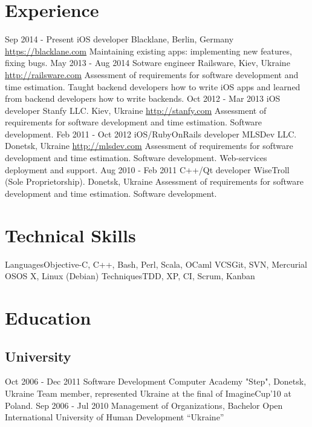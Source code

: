 \documentclass[11pt,a4paper]{moderncv}
\begin{document}
\section{Experience}
\cventry
  {Sep 2014 - Present}
  {iOS developer}
  {Blacklane, Berlin, Germany}
  {\newline{}\url{https://blacklane.com}}{}
  {Maintaining existing apps: implementing new features, fixing bugs.\newline{}}
\cventry
  {May 2013 - Aug 2014}
  {Sotware engineer}
  {Railsware, Kiev, Ukraine}
  {\newline{}\url{http://railsware.com}}{}
  {Assessment of requirements for software development and time estimation.\newline{}
  Taught backend developers how to write iOS apps and learned from backend developers how to write backends.}
\cventry
  {Oct 2012 - Mar 2013}
  {iOS developer}
  {Stanfy LLC. Kiev, Ukraine}
  {\newline{}\url{http://stanfy.com}}{}
  {Assessment of requirements for software development and time estimation. 
  \newline{}Software development.}
\cventry
  {Feb 2011 - Oct 2012}
  {iOS/RubyOnRails developer}
  {MLSDev LLC. Donetsk, Ukraine}
  {\newline{}\url{http://mlsdev.com}}{}
  {Assessment of requirements for software development and time estimation.\newline{}
  Software development. Web-services deployment and support.}
\cventry
  {Aug 2010 - Feb 2011}
  {C++/Qt developer}
  {WiseTroll (Sole Proprietorship). Donetsk, Ukraine}
  {}{}
  {Assessment of requirements for software development and time estimation. 
  \newline{}Software development.}

\section{Technical Skills}
\cvline
  {Languages}{Objective-C, C++, Bash, Perl, Scala, OCaml}
\cvline
  {VCS}{Git, SVN, Mercurial}
\cvline
  {OS}{OS X, Linux (Debian)}
\cvline
  {Techniques}{TDD, XP, CI, Scrum, Kanban}

\section{Education}
  \subsection{University}
  \cventry
    {Oct 2006 - Dec 2011}
    {Software Development}
    {Computer Academy "Step", Donetsk, Ukraine}
    {}{}
    {Team member, represented Ukraine at the final of ImagineCup'10 at Poland.}
  \cventry
    {Sep 2006 - Jul 2010}
    {Management of Organizations, Bachelor}
    {Open International University of Human Development “Ukraine”}
    {}{}{}
\end{document}
